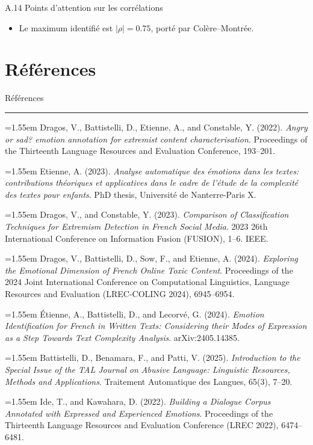 \documentclass[aspectratio=169,10pt,xcolor=table]{beamer}
\newcommand{\referenceitem}[4]{%
  \par\noindent\hangindent=1.55em\hangafter=1
  {\color{emotycMuted}\makebox[1.35em][l]{[#1]}}%
  #2 \emph{#3}. {\color{emotycMuted}#4}\par
  \vspace{0.38em}%
}
\begin{document}
\begin{frame}{A.14 Points d'attention sur les corrélations}
\small
\begin{itemize}
  \item Le maximum identifié est \(|\rho|=0.75\), porté par Colère--Montrée.
\end{itemize}
\end{frame}

\section*{Références}

\begin{frame}[t]
\vspace{0.15cm}
{\large\color{emotycAccent}Références}\par
\vspace{0.08cm}
{\color{emotycMuted}\rule{\textwidth}{0.35pt}}\par
\vspace{0.22cm}

\fontsize{6.8}{7.8}\selectfont
\color{emotycText}
\raggedright

\referenceitem{1}
{Dragos, V., Battistelli, D., Etienne, A., and Constable, Y. (2022).}
{Angry or sad? emotion annotation for extremist content characterisation}
{Proceedings of the Thirteenth Language Resources and Evaluation Conference, 193--201.}

\referenceitem{2}
{Etienne, A. (2023).}
{Analyse automatique des émotions dans les textes: contributions théoriques et applicatives dans le cadre de l'étude de la complexité des textes pour enfants}
{PhD thesis, Université de Nanterre-Paris X.}

\referenceitem{3}
{Dragos, V., and Constable, Y. (2023).}
{Comparison of Classification Techniques for Extremism Detection in French Social Media}
{2023 26th International Conference on Information Fusion (FUSION), 1--6. IEEE.}

\referenceitem{4}
{Dragos, V., Battistelli, D., Sow, F., and Etienne, A. (2024).}
{Exploring the Emotional Dimension of French Online Toxic Content}
{Proceedings of the 2024 Joint International Conference on Computational Linguistics, Language Resources and Evaluation (LREC-COLING 2024), 6945--6954.}

\referenceitem{5}
{Étienne, A., Battistelli, D., and Lecorvé, G. (2024).}
{Emotion Identification for French in Written Texts: Considering their Modes of Expression as a Step Towards Text Complexity Analysis}
{arXiv:2405.14385.}

\referenceitem{6}
{Battistelli, D., Benamara, F., and Patti, V. (2025).}
{Introduction to the Special Issue of the TAL Journal on Abusive Language: Linguistic Resources, Methods and Applications}
{Traitement Automatique des Langues, 65(3), 7--20.}

\referenceitem{7}
{Ide, T., and Kawahara, D. (2022).}
{Building a Dialogue Corpus Annotated with Expressed and Experienced Emotions}
{Proceedings of the Thirteenth Language Resources and Evaluation Conference (LREC 2022), 6474--6481.}
\end{frame}
\end{document}
